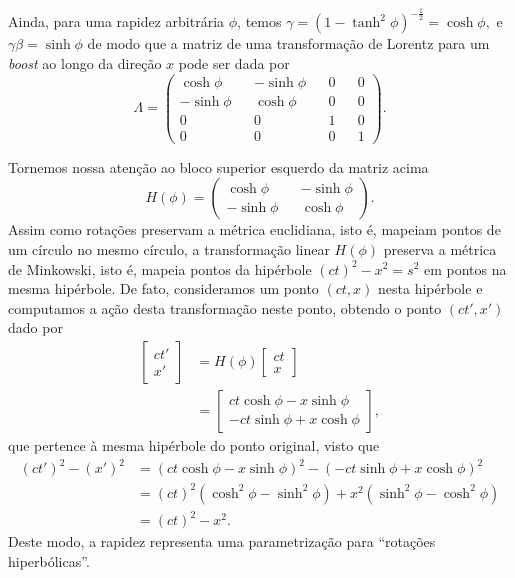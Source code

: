 Ainda, para uma rapidez arbitrária \(\phi\), temos \( \gamma = \left(1 - \tanh^2\phi\right)^{-\frac12} = \cosh \phi, \) e \( \gamma \beta =  \sinh \phi \) de modo que a matriz de uma transformação de Lorentz para um \textit{boost} ao longo da direção \(x\) pode ser dada por
\begin{equation*}
    \Lambda = \begin{pmatrix}
        \cosh \phi && -\sinh \phi && 0 && 0\\
        -\sinh \phi && \cosh \phi && 0 && 0\\
        0 && 0 && 1 && 0 \\
        0 && 0 && 0 && 1
    \end{pmatrix}.
\end{equation*}

Tornemos nossa atenção ao bloco superior esquerdo da matriz acima
\begin{equation*}
    H(\phi) = \begin{pmatrix}
        \cosh \phi && -\sinh \phi\\
        -\sinh \phi && \cosh \phi
    \end{pmatrix}.
\end{equation*}
Assim como rotações preservam a métrica euclidiana, isto é, mapeiam pontos de um círculo no mesmo círculo, a transformação linear \(H(\phi)\) preserva a métrica de Minkowski, isto é, mapeia pontos da hipérbole \((ct)^2 - x^2 = s^2\) em pontos na mesma hipérbole. De fato, consideramos um ponto \((ct, x)\) nesta hipérbole e computamos a ação desta transformação neste ponto, obtendo o ponto \((ct', x')\) dado por
\begin{align*}
    \begin{bmatrix}ct'\\x'\end{bmatrix} &= H(\phi) \begin{bmatrix}ct\\x\end{bmatrix}\\
                                        &= \begin{bmatrix} ct \cosh \phi - x\sinh \phi\\ -ct\sinh \phi + x \cosh \phi \end{bmatrix},
\end{align*}
que pertence à mesma hipérbole do ponto original, visto que
\begin{align*}
    (ct')^2 - (x')^2 &= (ct \cosh \phi - x \sinh \phi)^2 - (-ct \sinh \phi + x \cosh \phi)^2\\
                     &= (ct)^2 \left(\cosh^2 \phi - \sinh^2 \phi\right) + x^2 \left(\sinh^2 \phi - \cosh^2 \phi\right)\\
                     &= (ct)^2 - x^2.
\end{align*}
Deste modo, a rapidez representa uma parametrização para \enquote{rotações hiperbólicas}.

